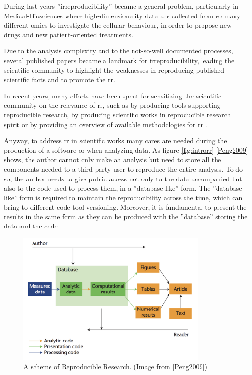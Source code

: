 During last years ''irreproducibility'' became a general problem, particularly in Medical-Biosciences where high-dimensionality data are collected from so many different omics to investigate the cellular behaviour, in order to propose new drugs and new patient-oriented treatments.

Due to the analysis complexity and to the not-so-well documented processes, several published papers \cite{Baggerly2009, Potti2011} became a landmark for irreproducibility, leading the scientific community to highlight the weaknesses in reproducing published scientific facts and to promote the \gls{rr}.

In recent years, many efforts have been spent for sensitizing the scientific community on the relevance of \gls{rr}, such as by producing tools \cite{RussoRighelli2016} supporting reproducible research, by producing scientific works in reproducible research spirit \cite{CostaRighelli2017} or by providing an overview of available methodologies for \gls{rr} \cite{russo2015advantages}.

Anyway, to address \gls{rr} in scientific works many cares are needed during the production of a software or when analyzing data.
As figure \ref{fig:introrr} \ref{Peng2009} shows, the author cannot only make an analysis but need to store all the components needed to a third-party user to reproduce the entire analysis.
To do so, the author needs to give public access not only to the data accompanied but also to the code used to process them, in a ''database-like'' form. 
The ''database-like'' form is required to maintain the reproducibility across the time, which can bring to different code tool versioning.
Moreover, it is fundamental to present the results in the same form as they can be produced with the ''database'' storing the data and the code.

\begin{figure}[H]
\centering
\includegraphics[width=9.5cm, keepaspectratio]{img/intro/rr_scheme.png}
\caption[RR generic scheme]{A scheme of Reproducible Research. (Image from \ref{Peng2009})}
\label{fig:omics}
\end{figure}

